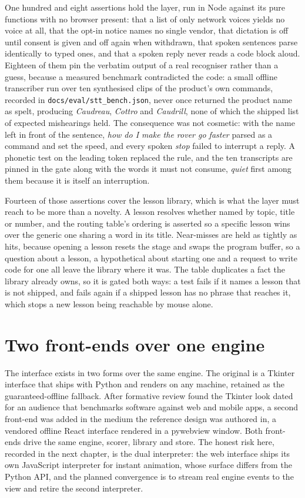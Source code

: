 \documentclass[11pt,a4paper]{report}
\begin{document}
One hundred and eight assertions hold the layer, run in Node against its pure functions with no browser present: that a list of only network voices yields no voice at all, that the opt-in notice names no single vendor, that dictation is off until consent is given and off again when withdrawn, that spoken sentences parse identically to typed ones, and that a spoken reply never reads a code block aloud. Eighteen of them pin the verbatim output of a real recogniser rather than a guess, because a measured benchmark contradicted the code: a small offline transcriber run over ten synthesised clips of the product's own commands, recorded in \texttt{docs/eval/stt\_bench.json}, never once returned the product name as spelt, producing \emph{Caudreau}, \emph{Cottro} and \emph{Caudrill}, none of which the shipped list of expected mishearings held. The consequence was not cosmetic: with the name left in front of the sentence, \emph{how do I make the rover go faster} parsed as a command and set the speed, and every spoken \emph{stop} failed to interrupt a reply. A phonetic test on the leading token replaced the rule, and the ten transcripts are pinned in the gate along with the words it must not consume, \emph{quiet} first among them because it is itself an interruption.

Fourteen of those assertions cover the lesson library, which is what the layer must reach to be more than a novelty. A lesson resolves whether named by topic, title or number, and the routing table's ordering is asserted so a specific lesson wins over the generic one sharing a word in its title. Near-misses are held as tightly as hits, because opening a lesson resets the stage and swaps the program buffer, so a question about a lesson, a hypothetical about starting one and a request to write code for one all leave the library where it was. The table duplicates a fact the library already owns, so it is gated both ways: a test fails if it names a lesson that is not shipped, and fails again if a shipped lesson has no phrase that reaches it, which stops a new lesson being reachable by mouse alone.

\section{Two front-ends over one engine}
The interface exists in two forms over the same engine. The original is a Tkinter interface that ships with Python and renders on any machine, retained as the guaranteed-offline fallback. After formative review found the Tkinter look dated for an audience that benchmarks software against web and mobile apps, a second front-end was added in the medium the reference design was authored in, a vendored offline React interface rendered in a pywebview window. Both front-ends drive the same engine, scorer, library and store. The honest risk here, recorded in the next chapter, is the dual interpreter: the web interface ships its own JavaScript interpreter for instant animation, whose surface differs from the Python API, and the planned convergence is to stream real engine events to the view and retire the second interpreter.
\end{document}
